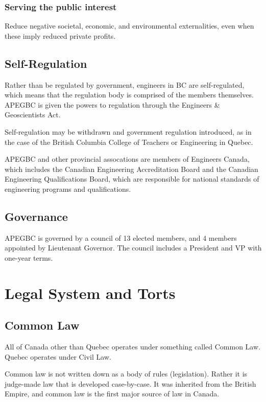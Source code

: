 \documentclass{article}
\begin{document}
\subsubsection{Serving the public interest}

Reduce negative societal, economic, and environmental externalities, even when these imply reduced private profits.

\subsection{Self-Regulation}

Rather than be regulated by government, engineers in BC are self-regulated, which means that the regulation body is comprised of the members themselves. APEGBC is given the powers to regulation through the Engineers \& Geoscientists Act. 

Self-regulation may be withdrawn and government regulation introduced, as in the case of the British Columbia College of Teachers or Engineering in Quebec.

APEGBC and other provincial assocations are members of Engineers Canada, which includes the Canadian Engineering Accreditation Board and the Canadian Engineering Qualifications Board, which are responsible for national standards of engineering programs and qualifications.

\subsection{Governance}

APEGBC is governed by a council of 13 elected members, and 4 members appointed by Lieutenant Governor. The council includes a President and VP with one-year terms.


\section{Legal System and Torts}

\subsection{Common Law}

All of Canada other than Quebec operates under something called Common Law. Quebec operates under Civil Law. 

Common law is not written down as a body of rules (legislation). Rather it is judge-made law that is developed case-by-case. It was inherited from the British Empire, and common law is the first major source of law in Canada.
\end{document}
